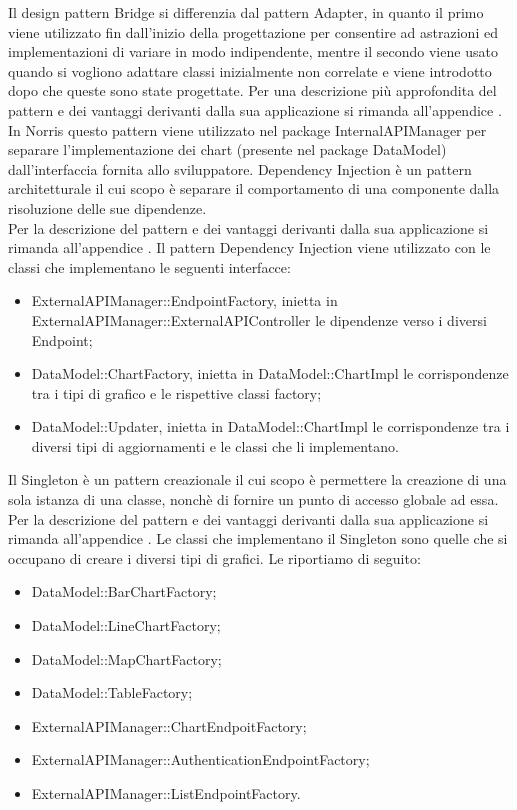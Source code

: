 			Il design pattern Bridge si differenzia dal pattern Adapter, in quanto il primo viene utilizzato fin dall'inizio della progettazione per consentire ad astrazioni ed implementazioni di variare in modo indipendente, mentre il secondo viene usato quando si vogliono adattare classi inizialmente non correlate e viene introdotto dopo che queste sono state progettate.
			Per una descrizione più approfondita del pattern e dei vantaggi derivanti dalla sua applicazione si rimanda all'appendice .
				In Norris questo pattern viene utilizzato nel package InternalAPIManager per separare l'implementazione dei chart (presente nel package DataModel) dall'interfaccia fornita allo sviluppatore.	
			Dependency Injection è un pattern architetturale il cui scopo è separare il comportamento di una componente dalla risoluzione delle sue dipendenze.\\
			Per la descrizione del pattern e dei vantaggi derivanti dalla sua applicazione si rimanda all'appendice .
				Il pattern Dependency Injection viene utilizzato con le classi che implementano le seguenti interfacce:
				\begin{itemize}
					\item ExternalAPIManager::EndpointFactory, inietta in ExternalAPIManager::ExternalAPIController le dipendenze verso i diversi Endpoint;
					\item DataModel::ChartFactory, inietta in DataModel::ChartImpl le  corrispondenze tra i tipi di grafico e le rispettive classi factory;
					\item DataModel::Updater, inietta in DataModel::ChartImpl le corrispondenze tra i diversi tipi di aggiornamenti e le classi che li implementano.
				\end{itemize}
				Il Singleton è un pattern creazionale il cui scopo è permettere la creazione di una sola istanza di una classe, nonchè di fornire un punto di accesso globale ad essa.\\
				Per la descrizione del pattern e dei vantaggi derivanti dalla sua applicazione si rimanda all'appendice .
					Le classi che implementano il Singleton sono quelle che si occupano di creare i diversi tipi di grafici. Le riportiamo di seguito:
					\begin{itemize}
						\item DataModel::BarChartFactory;
						\item DataModel::LineChartFactory;
						\item DataModel::MapChartFactory;
						\item DataModel::TableFactory;
						\item ExternalAPIManager::ChartEndpoitFactory;
						\item ExternalAPIManager::AuthenticationEndpointFactory;
						\item ExternalAPIManager::ListEndpointFactory.
					\end{itemize}
